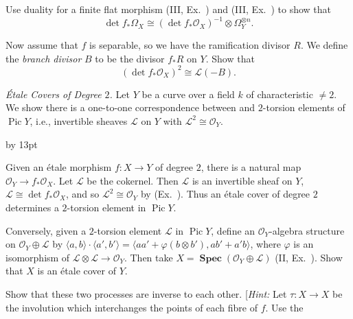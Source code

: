 {{{\noindent\hypertarget{ex-IV-2.6c}{}Use duality for a finite flat morphism (III, Ex.~) and (III, Ex.~) to show that
\[
\det f_*\Omega_X\cong(\det f_*\mathcal O_X)^{-1}\otimes\Omega_Y^{\otimes n}.
\]

\noindent\hypertarget{ex-IV-2.6d}{}Now assume that $f$ is separable, so we have the ramification divisor $R$. We define the \emph{branch divisor} $B$ to be the divisor $f_*R$ on $Y$. Show that
\[
(\det f_*\mathcal O_X)^2\cong\mathcal L(-B).
\]\par}

\smallskip
\noindent\hypertarget{ex-IV-2.7}{}\emph{\'Etale Covers of Degree $2$.} Let $Y$ be a curve over a field $k$ of characteristic $\ne2$. We show there is a one-to-one correspondence between
and $2$-torsion elements of $\operatorname{Pic}Y$, i.e., invertible sheaves $\mathcal L$ on $Y$ with $\mathcal L^2\cong\mathcal O_Y$.
{\advance\leftskip by 13pt\par
\noindent\hypertarget{ex-IV-2.7a}{}Given an \'etale morphism $f\colon X\to Y$ of degree $2$, there is a natural map $\mathcal O_Y\to f_*\mathcal O_X$. Let $\mathcal L$ be the cokernel. Then $\mathcal L$ is an invertible sheaf on $Y$, $\mathcal L\cong\det f_*\mathcal O_X$, and so $\mathcal L^2\cong\mathcal O_Y$ by (Ex.~)\EditionText{}. Thus an \'etale cover of degree $2$ determines a $2$-torsion element in $\operatorname{Pic}Y$.

\noindent\hypertarget{ex-IV-2.7b}{}Conversely, given a $2$-torsion element $\mathcal L$ in $\operatorname{Pic}Y$, define an $\mathcal O_Y$-algebra structure on $\mathcal O_Y\oplus\mathcal L$ by $\langle a,b\rangle\cdot\langle a',b'\rangle=\langle aa'+\varphi(b\otimes b'),ab'+a'b\rangle$, where $\varphi$ is an isomorphism of $\mathcal L\otimes\mathcal L\to\mathcal O_Y$. Then take $X=\operatorname{\mathbf{Spec}}(\mathcal O_Y\oplus\mathcal L)$ (II, Ex.~). Show that $X$ is an \'etale cover of $Y$.

\noindent\hypertarget{ex-IV-2.7c}{}Show that these two processes are inverse to each other. [\emph{Hint:} Let $\tau\colon X\to X$ be the involution which interchanges the points of each fibre of $f$. Use the\par}\par}
}
